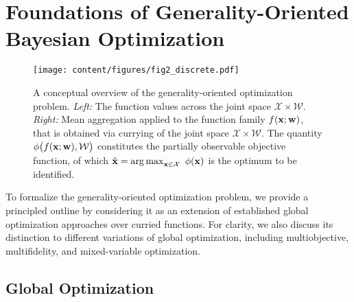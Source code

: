 \section{Foundations of Generality-Oriented Bayesian Optimization} \label{sec:GenBO_explanation}

\begin{figure*}[t]
    \centering
    \texttt{[image: content/figures/fig2\_discrete.pdf]}
    \vspace{-1em}
    \caption{
        A conceptual overview of the generality-oriented optimization problem. 
        \emph{Left:} The function values across the joint space $\mathcal{X} \times \mathcal{W}$. 
        \emph{Right:} Mean aggregation applied to the function family $f({\mathbf{x}}; {\mathbf{w}})$, that is obtained via currying of the joint space $\mathcal{X} \times \mathcal{W}$. 
         The quantity $\phi\big(f({\mathbf{x}}; {\mathbf{w}}), {\mathcal{W}}\big)$ constitutes the partially observable objective function, of which $\hat{{\mathbf{x}}} =  \operatorname*{arg\,max}_{{\mathbf{x}} \in {\mathcal{X}}} \ \phi({\mathbf{x}})$ is the optimum to be identified. 
    }
    \label{fig:genbo-conceptual}
\end{figure*}

To formalize the generality-oriented optimization problem, we provide a principled outline by considering it as an extension of established global optimization approaches over curried functions. 
For clarity, we also discuss its distinction to different variations of global optimization, including multiobjective, multifidelity, and mixed-variable optimization.

\subsection{Global Optimization}

